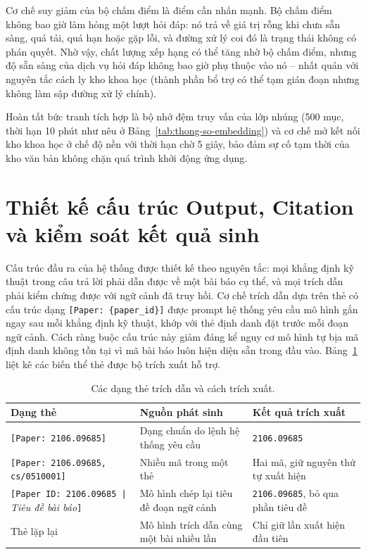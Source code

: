 Cơ chế suy giảm của bộ chấm điểm là điểm cần nhấn mạnh. Bộ chấm điểm không bao giờ làm hỏng một lượt hỏi đáp: nó trả về giá trị rỗng khi chưa sẵn sàng, quá tải, quá hạn hoặc gặp lỗi, và đường xử lý coi đó là trạng thái không có phán quyết. Nhờ vậy, chất lượng xếp hạng có thể tăng nhờ bộ chấm điểm, nhưng độ sẵn sàng của dịch vụ hỏi đáp không bao giờ phụ thuộc vào nó -- nhất quán với nguyên tắc cách ly kho khoa học (thành phần bổ trợ có thể tạm gián đoạn nhưng không làm sập đường xử lý chính).

Hoàn tất bức tranh tích hợp là bộ nhớ đệm truy vấn của lớp nhúng (500 mục, thời hạn 10 phút như nêu ở Bảng~\ref{tab:thong-so-embedding}) và cơ chế mở kết nối kho khoa học ở chế độ nền với thời hạn chờ 5 giây, bảo đảm sự cố tạm thời của kho văn bản không chặn quá trình khởi động ứng dụng.

\section{Thiết kế cấu trúc Output, Citation và kiểm soát kết quả sinh}
\label{sec:output-citation}

Cấu trúc đầu ra của hệ thống được thiết kế theo nguyên tắc: mọi khẳng định kỹ thuật trong câu trả lời phải dẫn được về một bài báo cụ thể, và mọi trích dẫn phải kiểm chứng được với ngữ cảnh đã truy hồi. Cơ chế trích dẫn dựa trên thẻ có cấu trúc dạng \texttt{[Paper: \{paper\_id\}]} được prompt hệ thống yêu cầu mô hình gắn ngay sau mỗi khẳng định kỹ thuật, khớp với thẻ định danh đặt trước mỗi đoạn ngữ cảnh. Cách ràng buộc cấu trúc này giảm đáng kể nguy cơ mô hình tự bịa mã định danh không tồn tại vì mã bài báo luôn hiện diện sẵn trong đầu vào. Bảng~\ref{tab:dang-the-trich-dan} liệt kê các biến thể thẻ được bộ trích xuất hỗ trợ.

\begin{table}[htbp]
    \centering
    \caption{Các dạng thẻ trích dẫn và cách trích xuất.}
    \label{tab:dang-the-trich-dan}
    \small
    \begin{tabularx}{\textwidth}{@{}>{\raggedright\arraybackslash}p{4.8cm}>{\raggedright\arraybackslash}p{4.4cm}>{\raggedright\arraybackslash}X@{}}
        \toprule
        \textbf{Dạng thẻ} & \textbf{Nguồn phát sinh} & \textbf{Kết quả trích xuất} \\
        \midrule
        \texttt{[Paper: 2106.09685]} & Dạng chuẩn do lệnh hệ thống yêu cầu & \texttt{2106.09685} \\
        \texttt{[Paper: 2106.09685, cs/0510001]} & Nhiều mã trong một thẻ & Hai mã, giữ nguyên thứ tự xuất hiện \\
        \texttt{[Paper ID: 2106.09685 | }\textit{Tiêu đề bài báo}\texttt{]} & Mô hình chép lại tiêu đề đoạn ngữ cảnh & \texttt{2106.09685}, bỏ qua phần tiêu đề \\
        Thẻ lặp lại & Mô hình trích dẫn cùng một bài nhiều lần & Chỉ giữ lần xuất hiện đầu tiên \\
        \bottomrule
    \end{tabularx}
\end{table}

